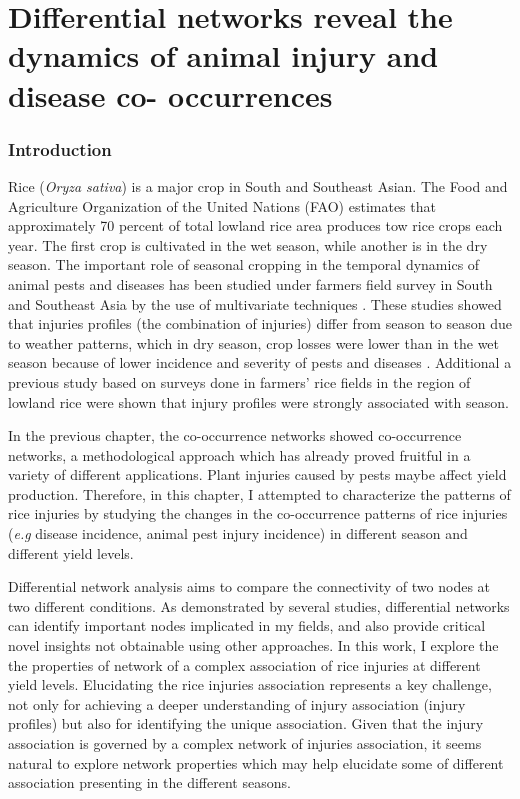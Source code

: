 \chapter{Differential networks reveal the dynamics of animal injury and disease co- occurrences}

\subsection{Introduction}
Rice (\textit{Oryza sativa}) is a major crop in South and Southeast Asian. The Food and Agriculture Organization of the United Nations (FAO) estimates that approximately 70 percent of total lowland rice area produces tow rice crops each year. The first crop is cultivated in the wet season, while another is in the dry season. The important role of seasonal cropping in the temporal dynamics of animal pests and diseases has been studied under farmers field survey in South and Southeast Asia by the use of multivariate techniques \citet{Savary_2000_Characterization, Willocquet_2008_Simulating}. These studies showed that injuries profiles (the combination of injuries) differ from season to season due to weather patterns, which in dry season, crop losses were lower than in the wet season because of lower incidence and severity of pests and diseases \citep{Litsinger_1991_Crop}. Additional a previous study based on surveys done in farmers’ rice fields in the region of lowland rice were shown that injury profiles were strongly associated with season.

In the previous chapter, the co-occurrence networks showed  co-occurrence networks, a methodological approach which has already proved fruitful in a variety of different applications.  Plant injuries caused by pests maybe affect yield production. Therefore, in this chapter, I attempted to characterize the patterns of rice injuries by studying the changes in the co-occurrence patterns of rice injuries (\textit{e.g} disease incidence, animal pest injury incidence) in different season and different yield levels.

Differential network analysis aims to compare the connectivity of two nodes at two different conditions. As demonstrated by several studies, differential networks can identify important nodes implicated in my fields, and also provide critical novel insights not obtainable using other approaches. In this work, I explore the the properties of network of a complex association of rice injuries at different yield levels. Elucidating the rice injuries association represents a key challenge, not only for achieving a deeper understanding of injury association (injury profiles) but also for identifying the unique association. Given that the injury association is governed by a complex network of injuries association, it seems natural to explore network properties which may help elucidate some of different association presenting in the different seasons.

